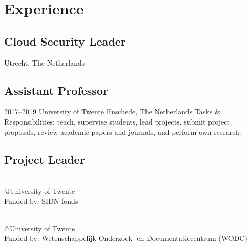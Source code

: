 \documentclass[print]{styles/friggeri-cv-mac} %
\begin{document}
\section{Experience}\vspace{-5pt}
\subsection{Cloud Security Leader}\vspace{-5pt}
\begin{entrylist}
{Utrecht, The Netherlands}
{}
\end{entrylist}
\subsection{Assistant Professor}\vspace{-5pt}
\begin{entrylist}
	\entry
	{2017--2019}
	{University of Twente}
	{Enschede, The Netherlands}
	{Tasks \& Responsibilities: teach, supervise students, lead projects, submit project proposals, review academic papers and journals, and perform own research.} 
\end{entrylist}
\newpage
\subsection{Project Leader}\vspace{-5pt}
\begin{entrylist}

{\\@University of Twente\\Funded by: SIDN fonds}%
{}

{\\@University of Twente\\Funded by: Wetenschappelijk Onderzoek- en Documentatiecentrum (WODC)}%
{}
\end{entrylist}
\end{document}
